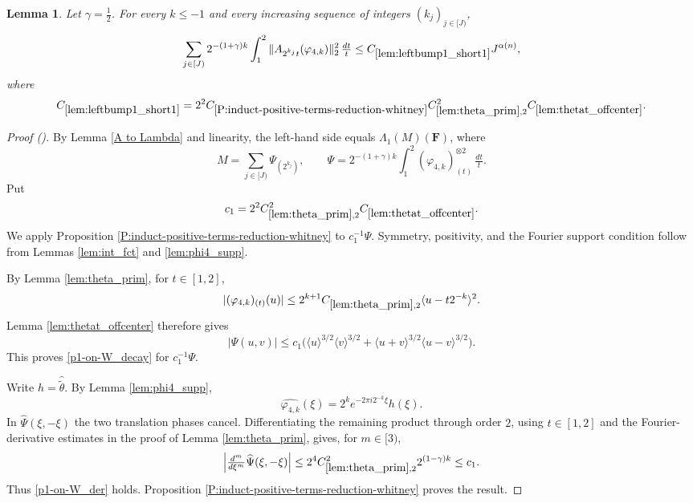 \documentclass[12pt,reqno]{amsart}
\newcommand{\auto}{{({\tiny\faCar})}}
\theoremstyle{plain}
\newtheorem{lemma}[theorem]{Lemma}
\numberwithin{equation}{section}
\theoremstyle{remark}
\newcommand{\using}[1]{}
\newcommand{\F}{\mathbf{F}}
\begin{document}
\begin{lemma}\label{lem:leftbump1_short1}\using{A to Lambda}\using{lem:theta_prim}\using{lem:thetat_offcenter}\using{P:induct-positive-terms-reduction-whitney}\using{lem:int_fct}\using{lem:phi4_supp}
Let $\gamma=\frac12$. For every $k\le-1$ and every increasing sequence of integers $(k_j)_{j\in[J)}$,
\begin{equation}\label{auto:left-bump-one-short-one-bound}
\sum_{j\in[J)}2^{-(1+\gamma)k}\int_1^2
\|A_{2^{k_j}t}(\varphi_{4,k})\|_2^2\,\tfrac{dt}{t}
\le C_{\ref{lem:leftbump1_short1}}J^{\alpha(n)},
\end{equation}
where
\begin{equation}\label{auto:left-bump-one-short-one-constant-definition}
C_{\ref{lem:leftbump1_short1}}
=2^2C_{\ref{P:induct-positive-terms-reduction-whitney}}
C_{\ref{lem:theta_prim},2}^2C_{\ref{lem:thetat_offcenter}}.
\end{equation}
\end{lemma}

\begin{proof}[Proof \auto]
By Lemma \ref{A to Lambda} and linearity, the left-hand side equals $\Lambda_1(M)(\F)$, where
\[
M=\sum_{j\in[J)}\Psi_{(2^{k_j})},
\qquad
\Psi=2^{-(1+\gamma)k}\int_1^2(\varphi_{4,k})_{(t)}^{\otimes2}\,\tfrac{dt}{t}.
\]
Put
\[
c_1=2^2C_{\ref{lem:theta_prim},2}^2C_{\ref{lem:thetat_offcenter}}.
\]
We apply Proposition \ref{P:induct-positive-terms-reduction-whitney} to $c_1^{-1}\Psi$. Symmetry, positivity, and the Fourier support condition follow from Lemmas \ref{lem:int_fct} and \ref{lem:phi4_supp}.

By Lemma \ref{lem:theta_prim}, for $t\in[1,2]$,
\[
|(\varphi_{4,k})_{(t)}(u)|
\le2^{k+1}C_{\ref{lem:theta_prim},2}
\langle u-t2^{-k}\rangle^2.
\]
Lemma \ref{lem:thetat_offcenter} therefore gives
\[
|\Psi(u,v)|
\le c_1\bigl(
\langle u\rangle^{3/2}\langle v\rangle^{3/2}
+\langle u+v\rangle^{3/2}\langle u-v\rangle^{3/2}
\bigr).
\]
This proves \eqref{p1-on-W_decay} for $c_1^{-1}\Psi$.

Write $h=\widehat{\widetilde\theta}$. By Lemma \ref{lem:phi4_supp},
\[
\widehat{\varphi_{4,k}}(\xi)
=2^ke^{-2\pi i2^{-k}\xi}h(\xi).
\]
In $\widehat\Psi(\xi,-\xi)$ the two translation phases cancel. Differentiating the remaining product through order $2$, using $t\in[1,2]$ and the Fourier-derivative estimates in the proof of Lemma \ref{lem:theta_prim}, gives, for $m\in[3)$,
\[
\left|\tfrac{d^m}{d\xi^m}\widehat\Psi(\xi,-\xi)\right|
\le2^4C_{\ref{lem:theta_prim},2}^2 2^{(1-\gamma)k}
\le c_1.
\]
Thus \eqref{p1-on-W_der} holds. Proposition \ref{P:induct-positive-terms-reduction-whitney} proves the result.
\end{proof}
\end{document}
